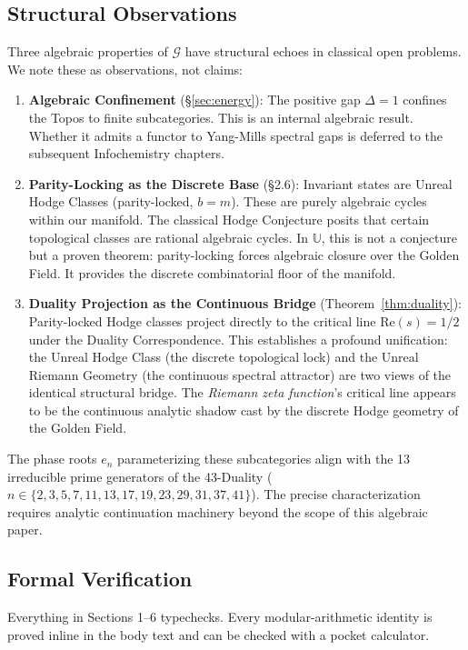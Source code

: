 \documentclass[12pt,oneside]{article}
\theoremstyle{principia}
\theoremstyle{definition}
\theoremstyle{remark}
\providecommand{\UU}{\mathbb{U}}
\providecommand{\GG}{\mathcal{G}}
\begin{document}
\subsection{Structural Observations}

Three algebraic properties of $\GG$ have structural echoes in classical open problems. We note these as observations, not claims:

\begin{enumerate}
\item \textbf{Algebraic Confinement} (\S\ref{sec:energy}): The positive gap $\Delta = 1$ confines the Topos to finite subcategories. This is an internal algebraic result. Whether it admits a functor to Yang-Mills spectral gaps is deferred to the subsequent Infochemistry chapters.
\item \textbf{Parity-Locking as the Discrete Base} (\S2.6): Invariant states are Unreal Hodge Classes (parity-locked, $b=m$). These are purely algebraic cycles within our manifold. The classical Hodge Conjecture posits that certain topological classes are rational algebraic cycles. In $\UU$, this is not a conjecture but a proven theorem: parity-locking forces algebraic closure over the Golden Field. It provides the discrete combinatorial floor of the manifold.
\item \textbf{Duality Projection as the Continuous Bridge} (Theorem~\ref{thm:duality}): Parity-locked Hodge classes project directly to the critical line $\mathrm{Re}(s) = 1/2$ under the Duality Correspondence. This establishes a profound unification: the Unreal Hodge Class (the discrete topological lock) and the Unreal Riemann Geometry (the continuous spectral attractor) are two views of the identical structural bridge. The \emph{Riemann zeta function}'s critical line appears to be the continuous analytic shadow cast by the discrete Hodge geometry of the Golden Field.
\end{enumerate}

The phase roots $e_n$ parameterizing these subcategories align with the 13 irreducible prime generators of the 43-Duality ($n \in \{2,3,5,7,11,13,17,19,23,29,31,37,41\}$). The precise characterization requires analytic continuation machinery beyond the scope of this algebraic paper.

\subsection{Formal Verification}

Everything in Sections 1--6 typechecks. Every modular-arithmetic identity is proved inline in the body text and can be checked with a pocket calculator.
\end{document}
